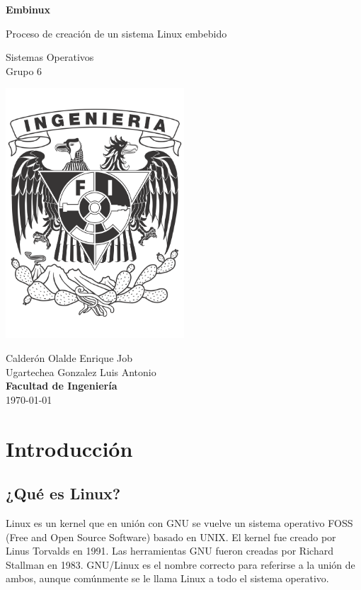 \documentclass[12pt, letterpaper]{article}
\begin{document}
	\begin{titlepage}
		\begin{center}
			\vspace*{1cm}

			\Huge
			\textbf{Embinux}

			\vspace{0.5cm}
			\Large
			Proceso de creación de un sistema Linux embebido

			Sistemas Operativos\\
			Grupo 6

			\includegraphics[width=0.5\textwidth]{ingenieria}

			\Large
			Calderón Olalde Enrique Job\\
			Ugartechea Gonzalez Luis Antonio\\
			\textbf{Facultad de Ingeniería}\\
            \today
		\end{center}
	\end{titlepage}

	\section{Introducción}

	\subsection{¿Qué es Linux?}

	Linux es un kernel que en unión con GNU se vuelve un sistema operativo FOSS (Free and Open Source Software) basado en UNIX. El kernel fue creado por Linus Torvalds en 1991. Las herramientas GNU fueron creadas por Richard Stallman en 1983. GNU/Linux es el nombre correcto para referirse a la unión de ambos, aunque comúnmente se le llama Linux a todo el sistema operativo.
\end{document}
